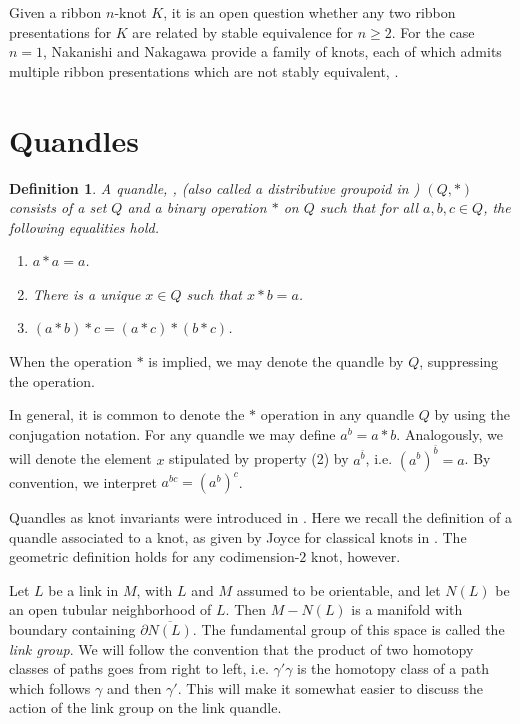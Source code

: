 \documentclass{amsart}
\newtheorem{definition}[theorem]{Definition}
\begin{document}
Given a ribbon $n$-knot $K$, it is an open question whether any two ribbon presentations for $K$ are related by stable equivalence for $n\geq 2$. For the case $n=1$, Nakanishi and Nakagawa provide a family of knots, each of which admits multiple ribbon presentations which are not stably equivalent, \cite{NakaNaka, Naka}.

\section{Quandles}\label{QaB}

\begin{definition}
A \emph{quandle}, \cite{DJ}, (also called a \emph{distributive groupoid} in \cite{Mat}) $(Q, *)$ consists of a set $Q$ and a binary operation $*$ on $Q$ such that for all $a, b, c \in Q$, the following equalities hold.

\begin{enumerate}
	\item $a*a=a$.

\item There is a unique $x\in Q$ such that $x*b=a$.

\item $(a*b)*c=(a*c)*(b*c)$.

\end{enumerate}
\end{definition}

When the operation $*$ is implied, we may denote the quandle by $Q$, suppressing the operation.

In general, it is common to denote the $*$ operation in any quandle $Q$ by using the conjugation notation. For any quandle we may define $a^{b}=a*b$. Analogously, we will denote the element $x$ stipulated by property (2) by $a^{\bar{b}}$, i.e. $(a^b)^{\bar{b}}=a$. By convention, we interpret $a^{bc}=(a^b)^c$.

Quandles as knot invariants were introduced in \cite{DJ, Mat}.
Here we recall the definition of a quandle associated to a knot, as given by Joyce for classical knots in \cite{DJ}. The geometric definition holds for any codimension-$2$ knot, however.


Let $L$ be a link in $M$, with $L$ and $M$ assumed to be orientable, and let $N(L)$ be an open tubular neighborhood of $L$. Then $M-N(L)$ is a manifold with boundary containing $\partial \overline{N(L)}$. The fundamental group of this space is called the \emph{link group}. We will follow the convention that the product of two homotopy classes of paths goes from right to left, i.e. $\gamma' \gamma$ is the homotopy class of a path which follows $\gamma$ and then $\gamma'$. This will make it somewhat easier to discuss the action of the link group on the link quandle.
\end{document}
